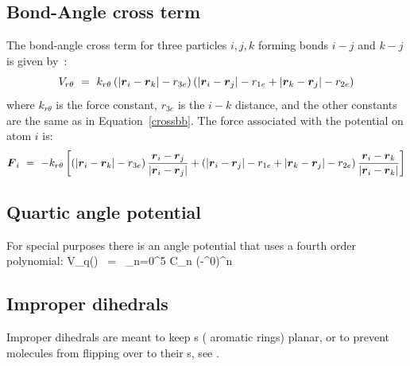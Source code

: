 \subsection{Bond-Angle cross term}
\label{subsec:bondanglecross}
The bond-angle cross term for three particles $i, j, k$ forming bonds
$i-j$ and $k-j$ is given by~\cite{Lawrence2003b}:
\begin{equation}
V_{r\theta} ~=~ k_{r\theta} \left(\left|\mbox{\boldmath ${r}$}_{i}-\mbox{\boldmath ${r}$}_k\right|-r_{3e} \right) \left(\left|\mbox{\boldmath ${r}$}_{i}-\mbox{\boldmath ${r}$}_j\right|-r_{1e} + \left|\mbox{\boldmath ${r}$}_{k}-\mbox{\boldmath ${r}$}_j\right|-r_{2e}\right)
\end{equation}
where $k_{r\theta}$ is the force constant, $r_{3e}$ is the $i-k$ distance,
and the other constants are the same as in Equation~\ref{crossbb}. The force
associated with the potential on atom $i$ is:
\begin{equation}
\mbox{\boldmath ${F}$}_{i} ~=~ -k_{r\theta}\left[\left(\left|\mbox{\boldmath ${r}$}_{i}-\mbox{\boldmath ${r}$}_{k}\right|-r_{3e}\right)\frac{\mbox{\boldmath ${r}$}_i-\mbox{\boldmath ${r}$}_j}{\left|\mbox{\boldmath ${r}$}_{i}-\mbox{\boldmath ${r}$}_j\right|} \\
+ \left(\left|\mbox{\boldmath ${r}$}_{i}-\mbox{\boldmath ${r}$}_j\right|-r_{1e} + \left|\mbox{\boldmath ${r}$}_{k}-\mbox{\boldmath ${r}$}_j\right|-r_{2e}\right)\frac{\mbox{\boldmath ${r}$}_i-\mbox{\boldmath ${r}$}_k}{\left|\mbox{\boldmath ${r}$}_{i}-\mbox{\boldmath ${r}$}_k\right|}\right]
\end{equation}

\subsection{Quartic angle potential}
\label{subsec:quarticangle}
For special purposes there is an angle potential
that uses a fourth order polynomial:
\beq
V_q(\tijk) ~=~ \sum_{n=0}^5 C_n (\tijk-\tijk^0)^n
\eeq

\newcommand{\rvkj}{{\bf r}_{kj}}
\newcommand{\rkj}{r_{kj}}

\subsection{Improper dihedrals}
\label{sec:imp}
Improper dihedrals are meant to keep s ({\eg} 
aromatic rings) planar, or to prevent molecules from flipping over to their
s, see .

